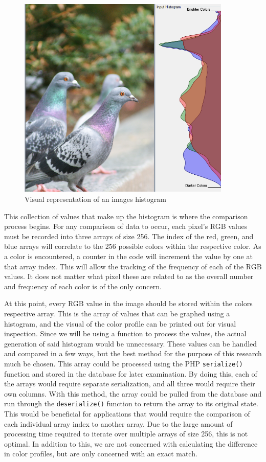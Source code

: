 \begin{figure}[htbp]
\centering
\includegraphics[width=4in]{historep}
\caption{Visual representation of an images histogram}
\label{historep}
\end{figure}

This collection of values that make up the histogram is where the comparison process begins. For any comparison of data to occur, each pixel's RGB values must be recorded into three arrays of size 256. The index of the red, green, and blue arrays will correlate to the 256 possible colors within the respective color. As a color is encountered, a counter in the code will increment the value by one at that array index. This will allow the tracking of the frequency of each of the RGB values. It does not matter what pixel these are related to as the overall number and frequency of each color is of the only concern.

At this point, every RGB value in the image should be stored within the colors respective array. This is the array of values that can be graphed using a histogram, and the visual of the color profile can be printed out for visual inspection. Since we will be using a function to process the values, the actual generation of said histogram would be unnecessary. These values can be handled and compared in a few ways, but the best method for the purpose of this research much be chosen. This array could be processed using the PHP {\tt serialize()} function and stored in the database for later examination. By doing this, each of the arrays would require separate serialization, and all three would require their own columns. With this method, the array could be pulled from the database and run through the {\tt deserialize()} function to return the array to its original state. This would be beneficial for applications that would require the comparison of each individual array index to another array. Due to the large amount of processing time required to iterate over multiple arrays of size 256, this is not optimal. In addition to this, we are not concerned with calculating the difference in color profiles, but are only concerned with an exact match.

